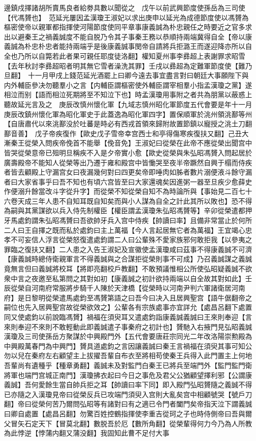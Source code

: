 邊鎮戍擇諸胡所賣馬良者給劵具數以聞從之　戊午以前武興節度使孫岳為三司使【代馮贇也】　范延光屢因孟漢瓊王淑妃以求出庚申以延光為成德節度使以馮贇為樞密使帝以親軍都指揮使河陽節度使同平章事康義誠為朴忠親任之時要近之官多求出以避秦王之禍義誠度不能自脱乃令其子事秦王務以恭順持兩端冀得自全【帝以康義誠為朴忠朴忠者能持兩端乎是後康義誠事閔帝自請將兵拒潞王而遂迎降亦所以自全也乃所以自斃若此者果可親任耶度徒洛翻】權知夏州事李彞超上表謝罪求昭雪【去年秋討李彞超昭者明其無它雪者澡洗其罪】壬戌以彞超為定難軍節度使【難乃旦翻】　十一月甲戌上錢范延光酒罷上曰卿今遠去事宜盡言對曰朝廷大事願陛下與内外輔臣參决勿聽羣小之言【内輔臣謂樞密使外輔臣謂宰相羣小指孟漢瓊之黨】遂相泣而别【語而相泣死期將至不知泣下也】時孟漢瓊用事附之者共為朋黨以蔽惑上聽故延光言及之　庚辰改慎州懷化軍【九域志慎州昭化軍節度五代會要是年十一月庚辰改鎮州懷化軍為昭化軍史于此蓋逸為昭化軍四字】置保順軍於洮州領洮鄯等州【自唐肅代以來洮鄯没於吐蕃是時必有西戎首領來歸附故置節鎮以寵授之洮土刀翻鄯音善】　戊子帝疾復作【歐史戊子雪帝幸宫西士和亭得傷寒疾復扶又翻】己丑大漸秦王從榮入問疾帝俛首不能舉【俛音免】王淑妃曰從榮在此帝不應從榮出聞宫中皆哭從榮意帝已殂明旦稱疾不入是夕帝實小愈【歐史從榮與朱弘昭馮贇入問起居於廣壽殿帝不能知人從榮等出乃遷于雍和殿宫中皆慟哭至夜半帝蹶然自興于榻而侍疾者皆去顧殿上守漏宫女曰夜漏幾何對曰四更矣帝即唾肉如胏者數片溺便液斗餘守漏者曰大家省事乎曰吾不知也有頃六宫皆至曰大家還魂矣因進粥一器至旦疾少愈薛史作便溺升餘當改斗字從升字】而從榮不知從榮自知不為時論所與【事始見二百七十六卷天成三年人患不自知耳既自知矣而與小人謀為自全之計此其所以敗也】恐不得為嗣與其黨謀欲以兵入侍先制權臣【權臣謂孟漢瓊朱弘昭馮贇等】辛卯從榮遣都押牙馬處鈞謂朱弘昭馮贇曰吾欲帥牙兵入宫中侍疾【帥讀曰率】且備非常當止於何所二人曰王自擇之既而私於處鈞曰主上萬福【今人言起居無它者為萬福】王宜竭心忠孝不可妄信人浮言從榮怒復遣處鈞謂二人曰公輩殊不愛家族邪何敢拒我【以參夷之罪臨之復扶又翻】二人患之入告王淑妃及宣徽使孟漢瓊咸曰茲事不得康義誠不可濟【康義誠時總侍衛親軍言不得義誠與之合謀拒從榮則事不可成】乃召義誠謀之義誠竟無言但曰義誠將校耳【將即亮翻校戶教翻】不敢預議惟相公所使弘昭疑義誠不欲衆中言之夜邀至私第問之其對如初【康義誠之初計欲持兩端以自全故其對如此】壬辰從榮自河南府常服將步騎千人陳於天津橋【從榮時以河南尹判六軍諸衛居河南府】是日黎明從榮遣馬處鈞至馮贇第語之曰吾今曰决入且居興聖宫【語牛倨翻帝之嗣位也先入居興聖宫故從榮欲效之】公輩各有宗族處事亦宜詳允【處昌呂翻下處置同又使處鈞以前說臨馮贇】禍福在須臾耳又遣處鈞詣康義誠義誠曰王來則奉迎【言來則奉迎不來則不敢輕動此即義誠遣子事秦府之初計也】贇馳入右掖門見弘昭義誠漢瓊及三司使孫岳方聚謀於中興殿門外【五代會要唐莊宗同光二年改洛陽崇勲殿為中興殿萬春門為中興門】贇具道處鈞之言因讓義誠曰秦王言禍福在須臾其事可知公勿以兒在秦府左右顧望主上拔擢吾輩自布衣至將相苟使秦王兵得入此門置主上何地吾輩尚有遺種乎【種章勇翻】義誠未及對監門白秦王已將兵至端門外【監門監門衛將軍也端門宫城正南門】漢瓊拂衣起曰今日之事危及君父公猶顧望擇利邪【公謂康義誠】吾何愛餘生當自帥兵拒之耳【帥讀曰率下同】即入殿門弘昭贇隨之義誠不得已亦隨之入漢瓊見帝曰從榮反兵已攻端門須臾入宫則大亂矣宫中相顧號哭【號戶刀翻】帝曰從榮何苦乃爾問弘昭等有諸對曰有之適已令門者闔門矣帝指天泣下謂義誠曰卿自處置【處昌呂翻】勿驚百姓控鶴指揮使李重吉從珂之子也時侍側帝曰吾與爾父冒矢石定天下【冒莫北翻】數脱吾於厄【數所角翻】從榮輩得何力今乃為人所教為此悖逆【悖蒲内翻又蒲没翻】我固知此曹不足付大事